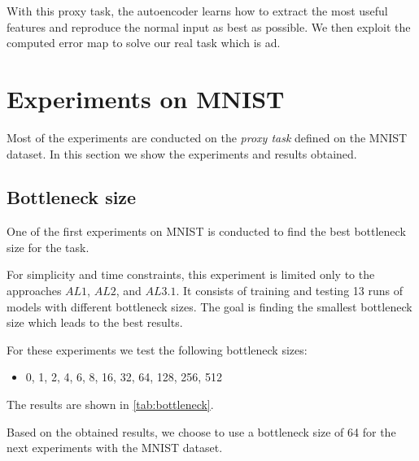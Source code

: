         With this proxy task, the autoencoder learns how to extract the most useful features and reproduce the normal input as best as possible. We then exploit the computed error map to solve our real task which is \acrshort{ad}.

    \section{Experiments on MNIST}
        Most of the experiments are conducted on the \emph{proxy task} defined on the MNIST dataset. In this section we show the experiments and results obtained.
        \subsection{Bottleneck size}
        \label{sub:bn}
            One of the first experiments on MNIST is conducted to find the best bottleneck size for the task. 
            
            For simplicity and time constraints, this experiment is limited only to the approaches $AL1$, $AL2$, and $AL3.1$.
            It consists of training and testing 13 runs of models with different bottleneck sizes. The goal is finding the smallest bottleneck size which leads to the best results.
            
            For these experiments we test the following bottleneck sizes:
            \begin{itemize}
                \item 0, 1, 2, 4, 6, 8, 16, 32, 64, 128, 256, 512
            \end{itemize}
            The results are shown in \autoref{tab:bottleneck}.
            
            Based on the obtained results, we choose to use a bottleneck size of 64 for the next experiments with the MNIST dataset.
        

